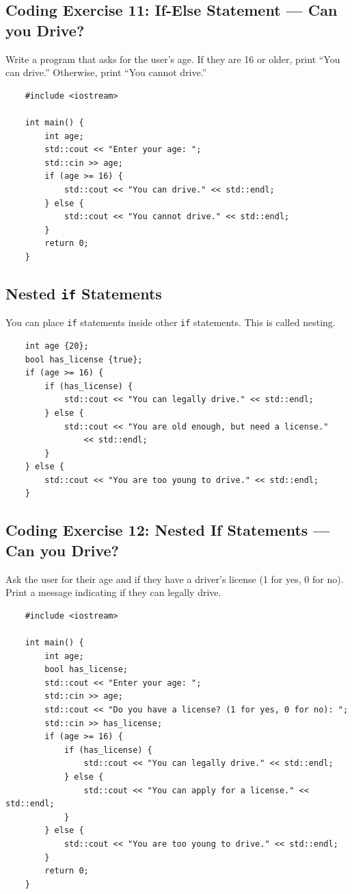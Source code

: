 \subsection{Coding Exercise 11: If-Else Statement --- Can you Drive?}
Write a program that asks for the user's age. If they are 16 or older, print ``You can drive.'' Otherwise, print ``You cannot drive.''
\begin{lstlisting}
	#include <iostream>

	int main() {
		int age;
		std::cout << "Enter your age: ";
		std::cin >> age;
		if (age >= 16) {
			std::cout << "You can drive." << std::endl;
		} else {
			std::cout << "You cannot drive." << std::endl;
		}
		return 0;
	}
\end{lstlisting}

\subsection{Nested \texttt{if} Statements}
You can place \texttt{if} statements inside other \texttt{if} statements. This is called nesting.
\begin{lstlisting}
	int age {20};
	bool has_license {true};
	if (age >= 16) {
		if (has_license) {
			std::cout << "You can legally drive." << std::endl;
		} else {
			std::cout << "You are old enough, but need a license."
				<< std::endl;
		}
	} else {
		std::cout << "You are too young to drive." << std::endl;
	}
\end{lstlisting}

\subsection{Coding Exercise 12: Nested If Statements --- Can you Drive?}
Ask the user for their age and if they have a driver's license (1 for yes, 0 for no). Print a message indicating if they can legally drive.
\begin{lstlisting}
	#include <iostream>

	int main() {
		int age;
		bool has_license;
		std::cout << "Enter your age: ";
		std::cin >> age;
		std::cout << "Do you have a license? (1 for yes, 0 for no): ";
		std::cin >> has_license;
		if (age >= 16) {
			if (has_license) {
				std::cout << "You can legally drive." << std::endl;
			} else {
				std::cout << "You can apply for a license." << std::endl;
			}
		} else {
			std::cout << "You are too young to drive." << std::endl;
		}
		return 0;
	}
\end{lstlisting}

